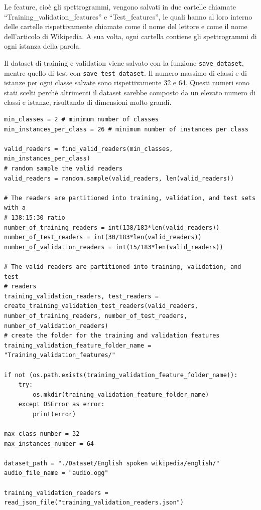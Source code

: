 \documentclass[12pt,a4paper,titlepage]{article}
\begin{document}
Le feature, cioè gli spettrogrammi, vengono salvati in due cartelle chiamate ``Training\_validation\_features'' e ``Test\_features'', le quali hanno al loro interno delle cartelle rispettivamente chiamate come il nome del lettore e come il nome dell'articolo di Wikipedia. A sua volta, ogni cartella contiene gli spettrogrammi di ogni istanza della parola.

Il dataset di training e validation viene salvato con la funzione \texttt{save\_dataset}, mentre quello di test con \texttt{save\_test\_dataset}. Il numero massimo di classi e di istanze per ogni classe salvate sono rispettivamente 32 e 64. Questi numeri sono stati scelti perché altrimenti il dataset sarebbe composto da un elevato numero di classi e istanze, risultando di dimensioni molto grandi.

\begin{lstlisting}[language=iPython,firstnumber=262, caption=preprocessing.py, label=preprocessing,captionpos=b]
min_classes = 2 # minimum number of classes
min_instances_per_class = 26 # minimum number of instances per class

valid_readers = find_valid_readers(min_classes, min_instances_per_class)
# random sample the valid readers
valid_readers = random.sample(valid_readers, len(valid_readers))

# The readers are partitioned into training, validation, and test sets with a 
# 138:15:30 ratio
number_of_training_readers = int(138/183*len(valid_readers))
number_of_test_readers = int(30/183*len(valid_readers))
number_of_validation_readers = int(15/183*len(valid_readers))

# The valid readers are partitioned into training, validation, and test
# readers 
training_validation_readers, test_readers = create_training_validation_test_readers(valid_readers, number_of_training_readers, number_of_test_readers, number_of_validation_readers)
# create the folder for the training and validation features
training_validation_feature_folder_name = "Training_validation_features/"

if not (os.path.exists(training_validation_feature_folder_name)):
    try:
        os.mkdir(training_validation_feature_folder_name)
    except OSError as error:
        print(error)   

max_class_number = 32
max_instances_number = 64

dataset_path = "./Dataset/English spoken wikipedia/english/"
audio_file_name = "audio.ogg"

training_validation_readers = read_json_file("training_validation_readers.json")


\end{lstlisting}
\end{document}
